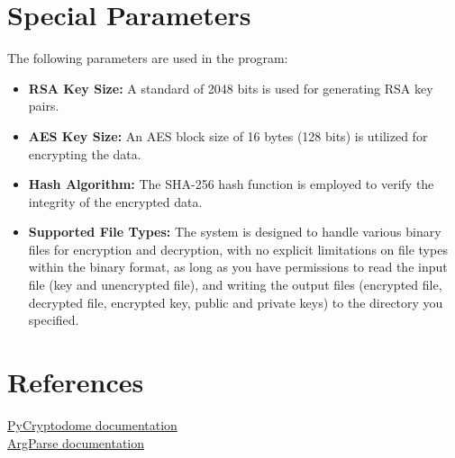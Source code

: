 \documentclass{article}
\begin{document}
\section{Special Parameters}
The following parameters are used in the program:
\begin{itemize}
    \item \textbf{RSA Key Size:} A standard of 2048 bits is used for generating RSA key pairs.
    \item \textbf{AES Key Size:} An AES block size of 16 bytes (128 bits) is utilized for encrypting the data.
    \item \textbf{Hash Algorithm:} The SHA-256 hash function is employed to verify the integrity of the encrypted data.
    \item \textbf{Supported File Types:} The system is designed to handle various binary files for encryption and decryption, with no explicit limitations on file types within the binary format, as long as you have permissions to read the input file (key and unencrypted file), and writing the output files (encrypted file, decrypted file, encrypted key, public and private keys) to the directory you specified.
\end{itemize}

\section{References}
\href{https://pycryptodome.readthedocs.io/en/latest/index.html}{PyCryptodome documentation} \\
\href{https://docs.python.org/3/library/argparse.html}{ArgParse documentation}
\end{document}
